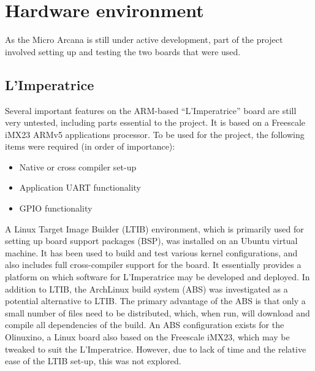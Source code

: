 

\section{Hardware environment} %
\label{sec:hardware_dev_env}
	As the Micro Arcana is still under active development, part of the project involved setting up and testing the two boards that were used.

	\subsection{L'Imperatrice} %
	\label{sub:l_imperatrice_env}
		Several important features on the ARM-based ``L'Imperatrice'' board are still very untested, including parts essential to the project.  It is based on a Freescale iMX23 ARMv5 applications processor.  To be used for the project, the following items were required (in order of importance):
		\begin{itemize}
			\item Native or cross compiler set-up
			\item Application UART functionality
			\item GPIO functionality
		\end{itemize}

		A Linux Target Image Builder (LTIB)  environment, which is primarily used for setting up board support packages (BSP), was installed on an Ubuntu virtual machine.  It has been used to build and test various kernel configurations, and also includes full cross-compiler support for the board.  It essentially provides a platform on which software for L'Imperatrice may be developed and deployed.
		In addition to LTIB, the ArchLinux build system (ABS) was investigated as a potential alternative to LTIB.  The primary advantage of the ABS is that only a small number of files need to be distributed, which, when run, will download and compile all dependencies of the build.  An ABS configuration exists for the Olinuxino, a Linux board also based on the Freescale iMX23, which may be tweaked to suit the L'Imperatrice.  However, due to lack of time and the relative ease of the LTIB set-up, this was not explored.


